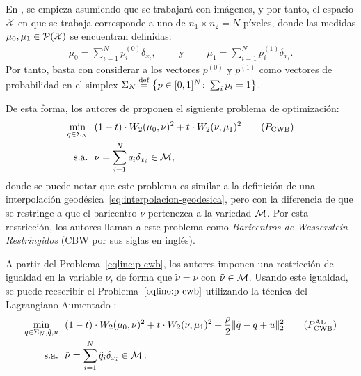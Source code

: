 En \cite{simon2020barycenters}, se empieza asumiendo que se trabajará con imágenes, y por tanto, el espacio $\cX$ en que se trabaja corresponde a uno de $n_1 \times n_2 = N$ píxeles, donde las medidas $\mu_0, \mu_1 \in \ProbSpace[\cX] $ se encuentran definidas:
\begin{align*}
    \mu_0 = \sum_{i=1}^{N} p^{(0)}_i \delta_{x_i},
    \qquad \text{ y } \qquad
    \mu_1 = \sum_{i=1}^{N} p^{(1)}_i \delta_{x_i}.
\end{align*}
Por tanto, basta con considerar a los vectores $p^{(0)}$ y $p^{(1)}$ como vectores de probabilidad en el simplex $\Simplex[N] \eqdef \left\{ p \in [0, 1]^{N} \colon \sum_i p_i = 1 \right\}$.

De esta forma, los autores de \cite{simon2020barycenters} proponen el siguiente problema de optimización:
\begin{align}
    \min_{q \in \Simplex[N]} & \ \ (1-t) \cdot \Wasserstein[2]{\mu_0}{\nu}^2 + t \cdot \Wasserstein[2]{\nu}{\mu_1}^2
    \tag{$P_{\mathrm{CWB}}$}\label{eqline:p-cwb}                                                                     \\
    \text{s.a.}              & \ \ \nu = \sum_{i=1}^{N} q_i \delta_{x_i} \in \Manifold,
\end{align}
donde se puede notar que este problema es similar a la definición de una interpolación geodésica~\eqref{eq:interpolacion-geodesica}, pero con la diferencia de que se restringe a que el baricentro $\nu$ pertenezca a la variedad $\Manifold$. Por esta restricción, los autores llaman a este problema como \textit{Baricentros de Wasserstein Restringidos} (CBW por sus siglas en inglés).


A partir del Problema~\eqref{eqline:p-cwb}, los autores imponen una restricción de igualdad en la variable $\nu$, de forma que $\tilde \nu = \nu$ con $\tilde \nu \in \Manifold$. Usando este igualdad, se puede reescribir el Problema~$\eqref{eqline:p-cwb}$ utilizando la técnica del Lagrangiano Aumentado \cite[Sec. 2.3]{boyd2011distributed}:
\begin{align}
    \min_{q\in\Simplex[N],\tilde q,u} & \ \ (1-t) \cdot \Wasserstein[2]{\mu_0}{\nu}^2 + t \cdot \Wasserstein[2]{\nu}{\mu_1}^2
    + \frac{\rho}{2} \| \tilde q - q + u \|_2^2 \tag{$P_{\mathrm{CWB}}^{\mathrm{AL}}$}\label{eqline:p-cwb-al}
    \\
    \text{s.a.}                       & \ \ \tilde \nu = \sum_{i=1}^{N} \tilde q_i \delta_{x_i} \in \Manifold.
\end{align}

